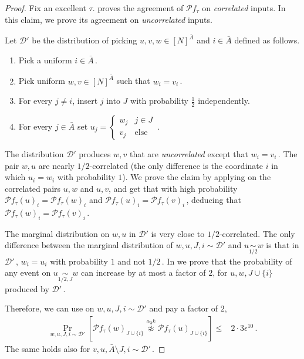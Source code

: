 \documentclass{toc}
\newcommand{\Prob}[2][]{\Pr_{{#1}}\left[#2\right]} %
\newcommand{\set}[1]{\{#1\}} %
\newcommand\f{f} %
\newcommand\bh{\mathcal{P}\f_\tau} %
\newcommand\neqg[1]{\stackrel{{#1}}{ \not\approx}} %
\newcommand\cor[1]{\underset{\scriptscriptstyle#1}{\sim}} %
\newcommand\rest[1]{{\bar{#1}}}  %
\begin{document}
\begin{proof}	
	Fix an excellent $\tau$.  proves the agreement of $\bh$ on \emph{correlated} inputs. In this claim, we prove its agreement on \emph{uncorrelated} inputs.

Let $\mathcal{D}'$ be the distribution of picking $u,v,w\in[N]^{\bar{A}}$ and $i\in\bar{A}$ defined %
as follows.  %
	\begin{enumerate}
		\item Pick a uniform $i\in\bar{A}$\,.
		\item Pick uniform $w,v\in[N]^{\bar{A}}$ such that $w_i=v_i$\,.
		\item For every $j\neq i$, insert $j$ into $J$ with probability $\frac{1}{2}$ independently.
		\item For every $j\in\bar{A}$ set $u_j = \begin{cases}
		w_j &  j\in J\\
		v_j & \text {else}
		\end{cases} $\,.
	\end{enumerate}
	The distribution $\mathcal{D}'$ produces $w,v$ that are \emph{uncorrelated} except that $w_i=v_i$\,. The pair $w,u$ are nearly 
%
%
$1/2$-correlated  %
(the only difference is the coordinate $i$ in which $u_i=w_i$ with probability $1$). 
	We prove the claim by applying  on the correlated pairs $u,w$ and $u,v$, and get that with high probability $\bh(u)_i = \bh(w)_i$ and $\bh(u)_i = \bh(v)_i$\,, deducing that $\bh(w)_i=\bh(v)_i$\,.
	
	The marginal distribution on $w,u$ in $\mathcal{D}'$ is very close to 
%
%
$1/2$-correlated.  %
The only difference between the marginal distribution of $w,u,J,i\sim\mathcal{D}'$ and $u\cor{1/2}w$ is that in $\mathcal{D}'$\,, $w_i=u_i$ with probability $1$ and not 
	$1/2$\,. %
    In  we prove that the probability of any event on $u\cor{1/2,J}w$ can increase by at most a factor of $2$, for $u,w,J\cup\set{i}$ produced by $\mathcal{D}'$\,. 
    
	Therefore, we can use  on $w,u,J,i\sim\mathcal{D}'$ and pay a factor of $2$,
	\begin{align}\label{eq:large diff}
	\Prob[w,u,J,i\sim\mathcal{D}']{\bh(w)_{J\cup\set{i}} \neqg{\alpha_3 k} \bh(u)_{J\cup\set{i}}} \leq& 2\cdot3\epsilon^{10}\,.%
	\end{align}
	The same holds also for $v,u,\rest{A}\setminus J,i\sim\mathcal{D}'$\,.
	

\end{proof}
\end{document}
